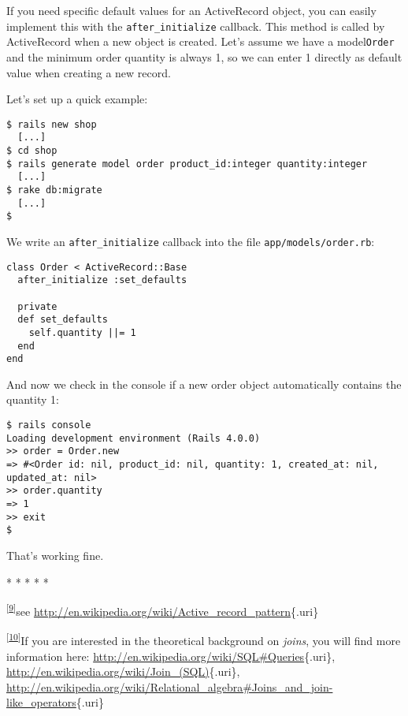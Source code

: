 \documentclass[a4paper]{book}
\begin{document}
If you need specific default values for an ActiveRecord object, you can easily implement this with the \texttt{after\_initialize} callback. This method is called by ActiveRecord when a new object is created. Let's assume we have a model\texttt{Order} and the minimum order quantity is always 1, so we can enter 1 directly as default value when creating a new record.

Let's set up a quick example:

\begin{shaded}\begin{verbatim}
$ rails new shop
  [...]
$ cd shop
$ rails generate model order product_id:integer quantity:integer
  [...]
$ rake db:migrate
  [...]
$
\end{verbatim}\end{shaded}

We write an \texttt{after\_initialize} callback into the file \texttt{app/models/order.rb}:

\begin{shaded}\begin{verbatim}
class Order < ActiveRecord::Base
  after_initialize :set_defaults

  private
  def set_defaults
    self.quantity ||= 1
  end
end
\end{verbatim}\end{shaded}

And now we check in the console if a new order object automatically contains the quantity 1:

\begin{shaded}\begin{verbatim}
$ rails console
Loading development environment (Rails 4.0.0)
>> order = Order.new
=> #<Order id: nil, product_id: nil, quantity: 1, created_at: nil, updated_at: nil>
>> order.quantity
=> 1
>> exit
$
\end{verbatim}\end{shaded}

That's working fine.

* * * * *

\textsuperscript{{[}\hyperref[idp2940224]{9}{]}}see \url{http://en.wikipedia.org/wiki/Active_record_pattern}\{.uri\}

\textsuperscript{{[}\hyperref[idp4450352]{10}{]}}If you are interested in the theoretical background on \emph{joins}, you will find more information here: \url{http://en.wikipedia.org/wiki/SQL\#Queries}\{.uri\}, \url{http://en.wikipedia.org/wiki/Join_(SQL)}\{.uri\}, \url{http://en.wikipedia.org/wiki/Relational_algebra\#Joins_and_join-like_operators}\{.uri\}
\end{document}
